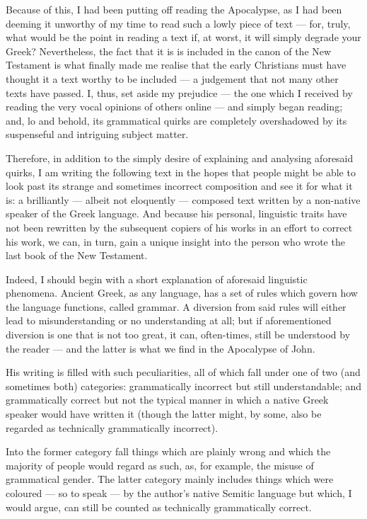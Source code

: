 Because of this, I had been putting off reading the Apocalypse, as I had been deeming it unworthy of my time to read such a lowly piece of text — for, truly, what would be the point in reading a text if, at worst, it will simply degrade your Greek? Nevertheless, the fact that it is is included in the canon of the New Testament is what finally made me realise that the early Christians must have thought it a text worthy to be included — a judgement that not many other texts have passed. I, thus, set aside my prejudice — the one which I received by reading the very vocal opinions of others online — and simply began reading; and, lo and behold, its grammatical quirks are completely overshadowed by its suspenseful and intriguing subject matter.

Therefore, in addition to the simply desire of explaining and analysing aforesaid quirks, I am writing the following text in the hopes that people might be able to look past its strange and sometimes incorrect composition and see it for what it is: a brilliantly — albeit not eloquently — composed text written by a non-native speaker of the Greek language. And because his personal, linguistic traits have not been rewritten by the subsequent copiers of his works in an effort to correct his work, we can, in turn, gain a unique insight into the person who wrote the last book of the New Testament.

Indeed, I should begin with a short explanation of aforesaid linguistic phenomena. Ancient Greek, as any language, has a set of rules which govern how the language functions, called grammar. A diversion from said rules will either lead to misunderstanding or no understanding at all; but if aforementioned diversion is one that is not too great, it can, often-times, still be understood by the reader — and the latter is what we find in the Apocalypse of John.

His writing is filled with such peculiarities, all of which fall under one of two (and sometimes both) categories: grammatically incorrect but still understandable; and grammatically correct but not the typical manner in which a native Greek speaker would have written it (though the latter might, by some, also be regarded as technically grammatically incorrect).

Into the former category fall things which are plainly wrong and which the majority of people would regard as such, as, for example, the misuse of grammatical gender. The latter category mainly includes things which were coloured — so to speak — by the author’s native Semitic language but which, I would argue, can still be counted as technically grammatically correct.

